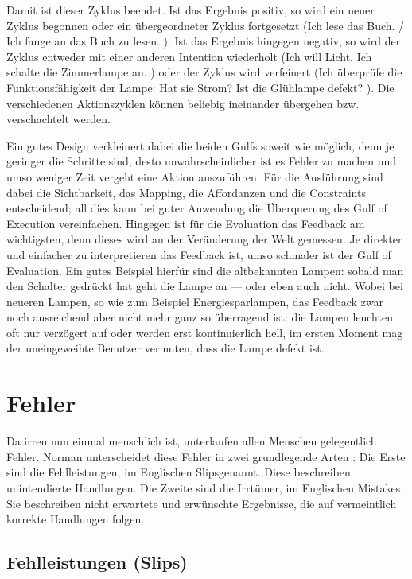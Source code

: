 \documentclass[parskip,headsepline, headtopline, %
footsepline, oneside, 12pt, headings=small]{scrreprt}
\begin{document}
Damit ist dieser Zyklus beendet. Ist das Ergebnis positiv, so wird ein neuer Zyklus begonnen oder ein übergeordneter Zyklus fortgesetzt (\glqq Ich lese das Buch. / Ich fange an das Buch zu lesen. \grqq). Ist das Ergebnis hingegen negativ, so wird der Zyklus entweder mit einer anderen Intention wiederholt (\glqq Ich will Licht. \textrightarrow Ich schalte die Zimmerlampe an. \grqq) oder der Zyklus wird verfeinert (\glqq Ich überprüfe die Funktionsfähigkeit der Lampe: Hat sie Strom? Ist die Glühlampe defekt?  \grqq). Die verschiedenen Aktionszyklen können beliebig ineinander übergehen bzw. verschachtelt werden. 

Ein gutes Design verkleinert dabei die beiden Gulfs soweit wie möglich, denn je geringer die Schritte sind, desto unwahrscheinlicher ist es Fehler zu machen und umso weniger Zeit vergeht eine Aktion auszuführen. Für die Ausführung sind dabei die Sichtbarkeit, das Mapping, die Affordanzen und die Constraints entscheidend; all dies kann bei guter Anwendung die Überquerung des Gulf of Execution vereinfachen. Hingegen ist für die Evaluation das Feedback am wichtigsten, denn dieses wird an der Veränderung der Welt gemessen. Je direkter und einfacher zu interpretieren das Feedback ist, umso schmaler ist der Gulf of Evaluation. Ein gutes Beispiel hierfür sind die altbekannten Lampen: sobald man den Schalter gedrückt hat geht die Lampe an --- oder eben auch nicht. Wobei bei neueren Lampen, so wie zum Beispiel Energiesparlampen, das Feedback zwar noch ausreichend aber nicht mehr ganz so überragend ist: die Lampen leuchten oft nur verzögert auf oder werden erst kontinuierlich hell, im ersten Moment mag der uneingeweihte Benutzer vermuten, dass die Lampe defekt ist. 

\section{Fehler}

Da irren nun einmal menschlich ist, unterlaufen allen Menschen gelegentlich Fehler. Norman unterscheidet diese Fehler in zwei grundlegende Arten \cite[S. 105]{don}: Die Erste sind die Fehlleistungen, im Englischen \glqq Slips\grqq  genannt. Diese beschreiben unintendierte Handlungen. Die Zweite sind die Irrtümer, im Englischen \glqq Mistakes\grqq. Sie beschreiben nicht erwartete und erwünschte Ergebnisse, die auf vermeintlich korrekte Handlungen folgen.

\subsection{Fehlleistungen (Slips)}
\end{document}
